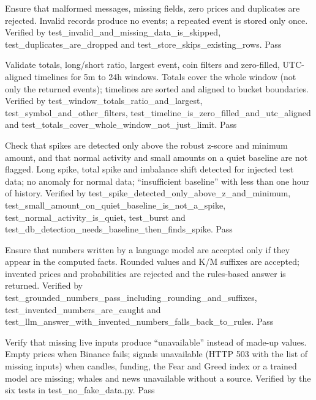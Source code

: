 {Ensure that malformed messages, missing fields, zero prices and duplicates are rejected.}
{Invalid records produce no events; a repeated event is stored only once.}
{Verified by test\_invalid\_and\_missing\_data\_is\_skipped, test\_duplicates\_are\_dropped and test\_store\_skips\_existing\_rows.}
{Pass}

{Validate totals, long/short ratio, largest event, coin filters and zero-filled, UTC-aligned timelines for 5m to 24h windows.}
{Totals cover the whole window (not only the returned events); timelines are sorted and aligned to bucket boundaries.}
{Verified by test\_window\_totals\_ratio\_and\_largest, test\_symbol\_and\_other\_filters, test\_timeline\_is\_zero\_filled\_and\_utc\_aligned and test\_totals\_cover\_whole\_window\_not\_just\_limit.}
{Pass}

{Check that spikes are detected only above the robust z-score and minimum amount, and that normal activity and small amounts on a quiet baseline are not flagged.}
{Long spike, total spike and imbalance shift detected for injected test data; no anomaly for normal data; ``insufficient baseline'' with less than one hour of history.}
{Verified by test\_spike\_detected\_only\_above\_z\_and\_minimum, test\_small\_amount\_on\_quiet\_baseline\_is\_not\_a\_spike, test\_normal\_activity\_is\_quiet, test\_burst and test\_db\_detection\_needs\_baseline\_then\_finds\_spike.}
{Pass}

{Ensure that numbers written by a language model are accepted only if they appear in the computed facts.}
{Rounded values and K/M suffixes are accepted; invented prices and probabilities are rejected and the rules-based answer is returned.}
{Verified by test\_grounded\_numbers\_pass\_including\_rounding\_and\_suffixes, test\_invented\_numbers\_are\_caught and test\_llm\_answer\_with\_invented\_numbers\_falls\_back\_to\_rules.}
{Pass}

{Verify that missing live inputs produce ``unavailable'' instead of made-up values.}
{Empty prices when Binance fails; signals unavailable (HTTP 503 with the list of missing inputs) when candles, funding, the Fear and Greed index or a trained model are missing; whales and news unavailable without a source.}
{Verified by the six tests in test\_no\_fake\_data.py.}
{Pass}

